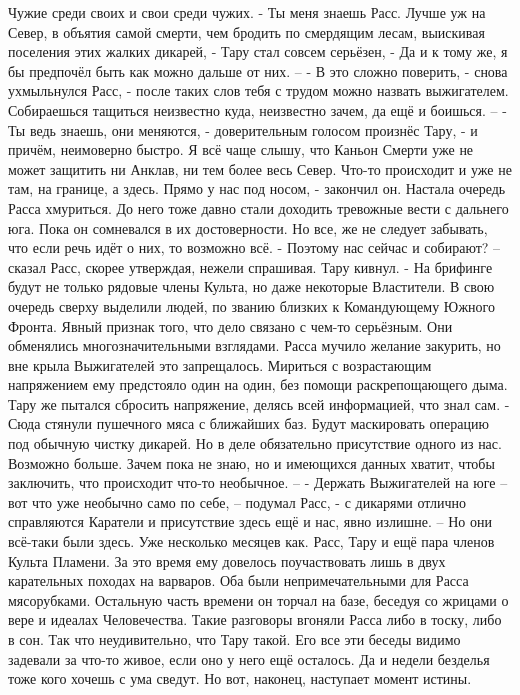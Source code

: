 \documentclass[a4paper, 12pt]{report}
\begin{document}
	Чужие среди своих и свои среди чужих.
 	- Ты меня знаешь Расс. Лучше уж на Север, в объятия самой смерти, чем бродить по смердящим лесам, выискивая поселения этих жалких дикарей, - Тару стал совсем серьёзен, - Да и к тому же, я бы предпочёл быть как можно дальше от них. –
	- В это сложно поверить, - снова ухмыльнулся Расс, - после таких слов тебя с трудом можно назвать выжигателем. Собираешься тащиться неизвестно куда, неизвестно зачем, да ещё и боишься. –
	- Ты ведь знаешь, они меняются, - доверительным голосом произнёс Тару, - и причём, неимоверно быстро. Я всё чаще слышу, что Каньон Смерти уже не может защитить ни Анклав, ни тем более весь Север. Что-то происходит и уже не там, на границе, а здесь. Прямо у нас под носом, - закончил он.
	Настала очередь Расса хмуриться. До него тоже давно стали доходить тревожные вести с дальнего юга. Пока он сомневался в их достоверности. Но все, же не следует забывать, что если речь идёт о них, то возможно всё.   
	- Поэтому нас сейчас и собирают? – сказал Расс, скорее утверждая, нежели спрашивая.
	Тару кивнул.
	- На брифинге будут не только рядовые члены Культа, но даже некоторые Властители. В свою очередь сверху выделили людей, по званию близких к Командующему Южного Фронта. Явный признак того, что дело связано с чем-то серьёзным.
	Они обменялись многозначительными взглядами. Расса мучило желание закурить, но вне крыла Выжигателей это запрещалось. Мириться с возрастающим напряжением ему предстояло один на один, без помощи раскрепощающего дыма. Тару же пытался сбросить напряжение, делясь всей информацией, что знал сам.
	- Сюда стянули пушечного мяса с ближайших баз. Будут маскировать операцию под обычную чистку дикарей. Но в деле обязательно присутствие одного из нас. Возможно больше. Зачем пока не знаю, но и имеющихся данных хватит, чтобы заключить, что происходит что-то необычное. –
	- Держать Выжигателей на юге – вот что уже необычно само по себе, – подумал Расс, - с дикарями отлично справляются Каратели и присутствие здесь ещё и нас, явно излишне. –
Но они всё-таки были здесь. Уже несколько месяцев как. Расс, Тару и ещё пара членов Культа Пламени. За это время ему довелось поучаствовать лишь в двух карательных походах на варваров. Оба были непримечательными для Расса мясорубками. Остальную часть времени он торчал на базе, беседуя со жрицами о вере и идеалах Человечества. Такие разговоры вгоняли Расса либо в тоску, либо в сон. Так что неудивительно, что Тару такой. Его все эти беседы видимо задевали за что-то живое, если оно у него ещё осталось. Да и недели безделья тоже кого хочешь с ума сведут. 
Но вот, наконец, наступает момент истины. 
\end{document}
